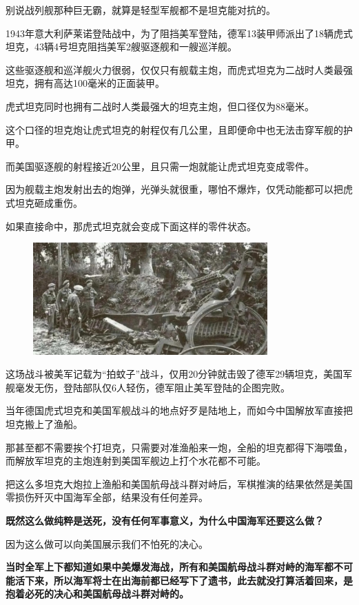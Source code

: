 \documentclass[UTF8, 11pt, oneside]{ctexart}
\newcommand{\zd}[1]{\textbf{\textcolor[RGB]{123,12,0}{#1}}} %
\begin{document}
别说战列舰那种巨无霸，就算是轻型军舰都不是坦克能对抗的。

1943年意大利萨莱诺登陆战中，为了阻挡美军登陆，德军13装甲师派出了18辆虎式坦克，43辆4号坦克阻挡美军2艘驱逐舰和一艘巡洋舰。

这些驱逐舰和巡洋舰火力很弱，仅仅只有舰载主炮，而虎式坦克为二战时人类最强坦克，拥有高达100毫米的正面装甲。

虎式坦克同时也拥有二战时人类最强大的坦克主炮，但口径仅为88毫米。

这个口径的坦克炮让虎式坦克的射程仅有几公里，且即便命中也无法击穿军舰的护甲。

而美国驱逐舰的射程接近20公里，且只需一炮就能让虎式坦克变成零件。

因为舰载主炮发射出去的炮弹，光弹头就很重，哪怕不爆炸，仅凭动能都可以把虎式坦克砸成重伤。

如果直接命中，那虎式坦克就会变成下面这样的零件状态。

\begin{figure}[H]
    \centering
    \includegraphics[width=9cm]{2024-08-18-005.jpg}
\end{figure}

这场战斗被美军记载为“拍蚊子”战斗，仅用20分钟就击毁了德军29辆坦克，美国军舰毫发无伤，登陆部队仅6人轻伤，德军阻止美军登陆的企图完败。

当年德国虎式坦克和美国军舰战斗的地点好歹是陆地上，而如今中国解放军直接把坦克搬上了渔船。

那甚至都不需要挨个打坦克，只需要对准渔船来一炮，全船的坦克都得下海喂鱼，而解放军坦克的主炮连射到美国军舰边上打个水花都不可能。

把这么多坦克大炮拉上渔船和美国航母战斗群对峙后，军棋推演的结果依然是美国零损伤歼灭中国海军全部，结果没有任何差异。

\zd{既然这么做纯粹是送死，没有任何军事意义，为什么中国海军还要这么做？}

因为这么做可以向美国展示我们不怕死的决心。

\zd{当时全军上下都知道如果中美爆发海战，所有和美国航母战斗群对峙的海军都不可能活下来，所以海军将士在出海前都已经写下了遗书，此去就没打算活着回来，是抱着必死的决心和美国航母战斗群对峙的。}
\end{document}
